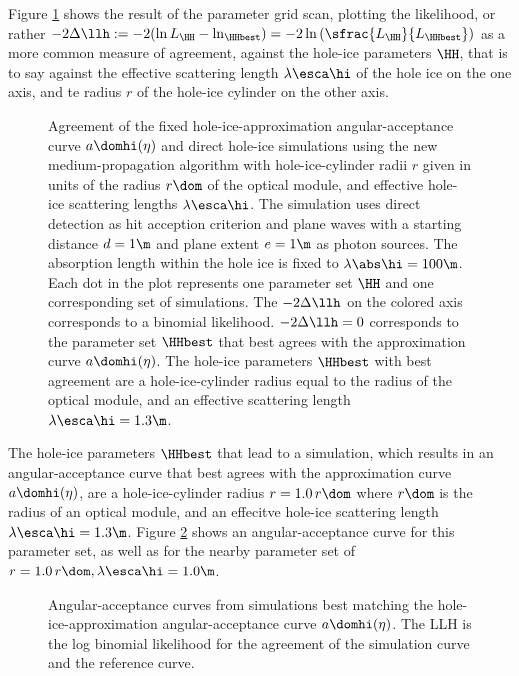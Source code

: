 Figure \ref{fig:AWa5aiCh} shows the result of the parameter grid scan, plotting the likelihood, or rather $-2\Delta\llh:= -2(\ln L_\HH - \ln_\HHbest) = -2 \ln \left(\sfrac{L_\HH}{L_\HHbest}\right)$ as a more common measure of agreement, against the hole-ice parameters $\HH$, that is to say against the effective scattering length $\lambda\esca\hi$ of the hole ice on the one axis, and te radius $r$ of the hole-ice cylinder on the other axis.

\begin{figure}[htbp]
  \caption{Agreement of the fixed hole-ice-approximation angular-acceptance curve $a\domhi(\eta)$ and direct hole-ice simulations using the new \clsim medium-propagation algorithm with hole-ice-cylinder radii $r$ given in units of the radius $r\dom$ of the optical module, and effective hole-ice scattering lengths $\lambda\esca\hi$. The simulation uses direct detection as hit acception criterion and plane waves with a starting distance $d=1\m$ and plane extent $e=1\m$ as photon sources. The absorption length within the hole ice is fixed to $\lambda\abs\hi=100\m$. Each dot in the plot represents one parameter set $\HH$ and one corresponding set of simulations. The $-2\Delta\llh$ on the colored axis corresponds to a binomial likelihood. $-2\Delta\llh = 0$ corresponds to the parameter set $\HHbest$ that best agrees with the approximation curve $a\domhi(\eta)$. The hole-ice parameters $\HHbest$ with best agreement are a hole-ice-cylinder radius equal to the radius of the optical module, and an effective scattering length $\lambda\esca\hi = 1.3\m$.}
  \label{fig:AWa5aiCh}
\end{figure}

The hole-ice parameters $\HHbest$ that lead to a simulation, which results in an angular-acceptance curve that best agrees with the approximation curve $a\domhi(\eta)$, are a hole-ice-cylinder radius $r = 1.0\,r\dom$ where $r\dom$ is the radius of an optical module, and an effecitve hole-ice scattering length $\lambda\esca\hi = 1.3\m$. Figure \ref{fig:weShir8i} shows an angular-acceptance curve for this parameter set, as well as for the nearby parameter set of $r=1.0\,r\dom, \lambda\esca\hi = 1.0\m$.

\begin{figure}[htbp]
  \hfill
  \caption{Angular-acceptance curves from simulations best matching the hole-ice-approximation angular-acceptance curve $a\domhi(\eta)$. The LLH is the log binomial likelihood for the agreement of the simulation curve and the reference curve.}
  \label{fig:weShir8i}
\end{figure}

